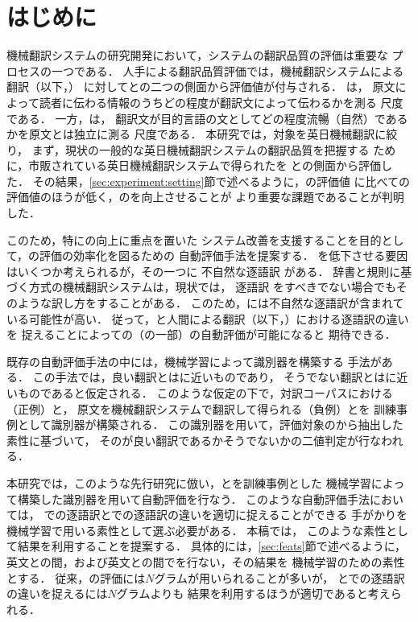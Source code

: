 \documentclass[japanese]{jnlp_1.4}
\newcommand{\align}{}
\newcommand{\ADE}{}
\newcommand{\FLU}{}
\newcommand{\HUM}{}
\newcommand{\MT}{}
\begin{document}
\maketitle



\section{はじめに}
\label{sec:introduction}


機械翻訳システムの研究開発において，システムの翻訳品質の評価は重要な
プロセスの一つである．
人手による翻訳品質評価では，機械翻訳システムによる翻訳（以下，{\MT}）
に対して{\ADE}と{\FLU}の二つの側面から評価値が付与される\cite{Sumita05}．
{\ADE}は，
原文によって読者に伝わる情報のうちどの程度が翻訳文によって伝わるかを測る
尺度である．
一方，{\FLU}は，
翻訳文が目的言語の文としてどの程度流暢（自然）であるかを原文とは独立に測る
尺度である．
本研究では，対象を英日機械翻訳に絞り，
まず，現状の一般的な英日機械翻訳システムの翻訳品質を把握する
ために，市販されている英日機械翻訳システムで得られた{\MT}を
{\ADE}と{\FLU}の側面から評価した．
その結果，\ref{sec:experiment:setting}節で述べるように，{\ADE}の評価値
に比べて{\FLU}の評価値のほうが低く，{\MT}の{\FLU}を向上させることが
より重要な課題であることが判明した．

このため，特に{\FLU}の向上に重点を置いた
システム改善を支援することを目的として，{\FLU}の評価の効率化を図るための
自動評価手法を提案する．
{\FLU}を低下させる要因はいくつか考えられるが，その一つに
不自然な逐語訳
がある．
辞書と規則に基づく方式の機械翻訳システムは，現状では，
逐語訳
をすべきでない場合でもそのような訳し方をすることがある．
このため，{\MT}には不自然な逐語訳が含まれている可能性が高い．
従って，{\MT}と人間による翻訳（以下，{\HUM}）における逐語訳の違いを
捉えることによって{\MT}の{\FLU}（の一部）の自動評価が可能になると
期待できる．





既存の自動評価手法の中には，機械学習によって識別器を構築する
手法\cite{Oliver01,Kulesza04,Gamon05,Tanaka08}がある．
この手法では，良い翻訳とは{\HUM}に近いものであり，
そうでない翻訳とは{\MT}に近いものであると仮定される．
このような仮定の下で，対訳コーパスにおける{\HUM}（正例）と，
原文を機械翻訳システムで翻訳して得られる{\MT}（負例）とを
訓練事例として識別器が構築される．
この識別器を用いて，評価対象の{\MT}から抽出した素性に基づいて，
その{\MT}が良い翻訳であるかそうでないかの二値判定が行なわれる．


本研究では，このような先行研究に倣い，{\HUM}と{\MT}を訓練事例とした
機械学習によって構築した識別器を用いて自動評価を行なう．
このような自動評価手法においては，
{\HUM}での逐語訳と{\MT}での逐語訳の違いを適切に捉えることができる
手がかりを機械学習で用いる素性として選ぶ必要がある．
本稿では，
このような素性として{\align}結果を利用することを提案する．
具体的には，\ref{sec:feats}節で述べるように，
英文と{\HUM}の間，および英文と{\MT}の間で{\align}を行ない，その結果を
機械学習のための素性とする．
従来，{\FLU}の評価には$N$グラムが用いられることが多いが，
{\HUM}と{\MT}での逐語訳の違いを捉えるには$N$グラムよりも
{\align}結果を利用するほうが適切であると考えられる．
\end{document}
